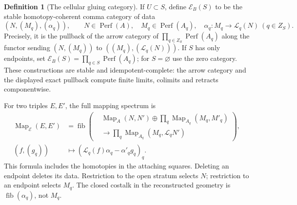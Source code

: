 \documentclass[11pt]{article}
\theoremstyle{definition}
\newtheorem{definition}[proposition]{Definition}
\theoremstyle{remark}
\newcommand{\Perf}{\operatorname{Perf}}
\begin{document}
\begin{definition}[The cellular gluing category]\label{def:cellular-gluing}
If $U\subset S$, define $\mathcal E_B(S)$ to be the stable
homotopy-coherent comma category of data
\[
 (N,(M_q),(\alpha_q)),\qquad
 N\in\Perf(A),\quad M_q\in\Perf(A_q),\quad
 \alpha_q:M_q\longrightarrow\mathcal L_q(N)\ (q\in Z_S).
\]
Precisely, it is the pullback of the arrow category of
$\prod_{q\in Z_S}\Perf(A_q)$ along the functor sending
$(N,(M_q))$ to $((M_q),(\mathcal L_q(N)))$.
If $S$ has only endpoints, set
$\mathcal E_B(S)=\prod_{q\in S}\Perf(A_q)$; for $S=\varnothing$
use the zero category.  These constructions are stable and
idempotent-complete: the arrow category and the displayed exact
pullback compute finite limits, colimits and retracts componentwise.
\end{definition}

For two triples $E,E'$, the full mapping spectrum is
\begin{equation}
\begin{aligned}
 \operatorname{Map}_{\mathcal E}(E,E') &=
 \operatorname{fib}\left(
  \begin{aligned}
   &\operatorname{Map}_A(N,N')\oplus
     \prod_q\operatorname{Map}_{A_q}(M_q,M'_q)\\
   &\longrightarrow\prod_q\operatorname{Map}_{A_q}(M_q,\mathcal L_qN')
  \end{aligned}
 \right),\\
 (f,(g_q)) &\longmapsto
 (\mathcal L_q(f)\alpha_q-\alpha'_qg_q)_q.
\end{aligned}
 \label{eq:cellular-maps}
\end{equation}
This formula includes the homotopies in the attaching squares.
Deleting an endpoint deletes its data.  Restriction to the open
stratum selects $N$; restriction to an endpoint selects $M_q$.
The closed costalk in the reconstructed geometry is
$\operatorname{fib}(\alpha_q)$, not $M_q$.
\end{document}
